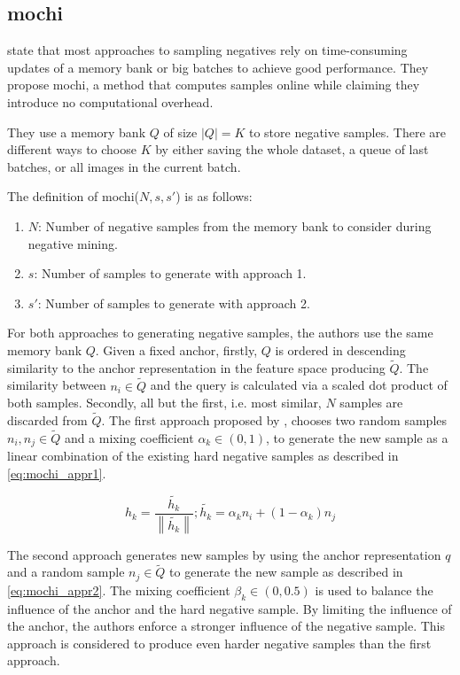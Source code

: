 \subsection{\acl{mochi}}\label{subsec:MoCHi}

\citet{mochi_2020} state that most approaches to sampling negatives rely on 
time-consuming updates of a memory bank or big batches to achieve good performance.
They propose \ac{mochi}, a method that computes samples online while claiming they introduce no computational overhead.

They use a memory bank $Q$ of size $| Q | = K$ to store negative samples.
There are different ways to choose $K$ by either saving the whole dataset, a queue of last batches,
or all images in the current batch.

The definition of \ac{mochi}($N, s, s'$) is as follows:
\begin{enumerate}
    \item $N$: Number of negative samples from the memory bank to consider during negative mining.
    \item $s$: Number of samples to generate with approach 1.
    \item $s'$: Number of samples to generate with approach 2.
\end{enumerate}
For both approaches to generating negative samples, the authors use the same memory bank $Q$.
Given a fixed anchor, firstly, $Q$ is ordered in descending similarity to the anchor representation    
in the feature space producing $\tilde{Q}$.
The similarity between $n_i \in \tilde{Q}$ and the query is calculated via 
a scaled dot product of both samples.
Secondly, all but the first, i.e. most similar, $N$ samples are discarded from $\tilde{Q}$.
The first approach proposed by \citeauthor{mochi_2020}, chooses two random samples $n_i, n_j \in \tilde{Q}$ 
and a mixing coefficient $\alpha_k \in (0,1)$, 
to generate the new sample as a linear combination of the existing hard negative samples 
as described in \eqref{eq:mochi_appr1}.

\begin{equation}
    h_k = \frac{\tilde{h_k}}{\left\| \tilde{h_k}  \right\|}; \tilde{h_k} = \alpha_k n_i + (1-\alpha_k)n_j
    \label{eq:mochi_appr1}
\end{equation}

The second approach generates new samples by using the anchor representation $q$ 
and a random sample $n_j \in \tilde{Q}$ to generate the new sample as described in \eqref{eq:mochi_appr2}.
The mixing coefficient $\beta_k \in (0,0.5)$ is used to balance the influence of the anchor 
and the hard negative sample.
By limiting the influence of the anchor, the authors enforce a stronger influence of the negative sample.
This approach is considered to produce even harder negative samples than the first approach.

